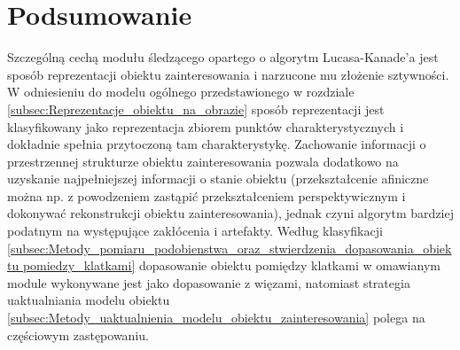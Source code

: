 \section{Podsumowanie}
\label{sec:LK_Podsumowanie}

Szczególną cechą modułu śledzącego opartego o algorytm Lucasa-Kanade'a jest sposób reprezentacji obiektu zainteresowania i narzucone mu złożenie sztywności. W odniesieniu do modelu ogólnego przedstawionego w rozdziale \ref{subsec:Reprezentacje_obiektu_na_obrazie} sposób reprezentacji jest klasyfikowany jako reprezentacja zbiorem punktów charakterystycznych i dokładnie spełnia przytoczoną tam charakterystykę. Zachowanie informacji o przestrzennej strukturze obiektu zainteresowania pozwala dodatkowo na uzyskanie najpełniejszej informacji o stanie obiektu (przekształcenie afiniczne można np. z powodzeniem zastąpić przekształceniem perspektywicznym i dokonywać rekonstrukcji obiektu zainteresowania), jednak czyni algorytm bardziej podatnym na występujące zakłócenia i artefakty. Według klasyfikacji \ref{subsec:Metody_pomiaru_podobienstwa_oraz_stwierdzenia_dopasowania_obiektu pomiedzy_klatkami} dopasowanie obiektu pomiędzy klatkami w omawianym module wykonywane jest jako dopasowanie z więzami, natomiast strategia uaktualniania modelu obiektu \ref{subsec:Metody_uaktualnienia_modelu_obiektu_zainteresowania} polega na częściowym zastępowaniu.